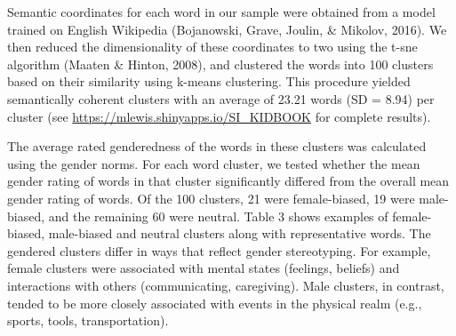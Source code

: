 \documentclass[english,,man,floatsintext]{apa6}
\begin{document}
Semantic coordinates for each word in our sample were obtained from a model trained on English Wikipedia (Bojanowski, Grave, Joulin, \& Mikolov, 2016). We then reduced the dimensionality of these coordinates to two using the t-sne algorithm (Maaten \& Hinton, 2008), and clustered the words into 100 clusters based on their similarity using k-means clustering. This procedure yielded semantically coherent clusters with an average of 23.21 words (SD = 8.94) per cluster (see \url{https://mlewis.shinyapps.io/SI_KIDBOOK} for complete results).

The average rated genderedness of the words in these clusters was calculated using the gender norms. For each word cluster, we tested whether the mean gender rating of words in that cluster significantly differed from the overall mean gender rating of words. Of the 100 clusters, 21 were female-biased, 19 were male-biased, and the remaining 60 were neutral. Table 3 shows examples of female-biased, male-biased and neutral clusters along with representative words. The gendered clusters differ in ways that reflect gender stereotyping. For example, female clusters were associated with mental states (feelings, beliefs) and interactions with others (communicating, caregiving). Male clusters, in contrast, tended to be more closely associated with events in the physical realm (e.g., sports, tools, transportation).
\end{document}
